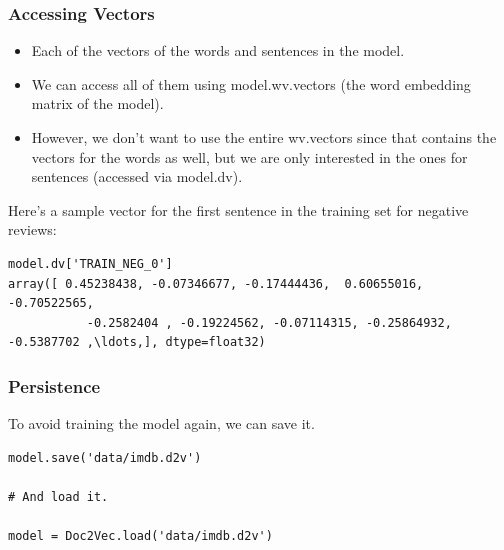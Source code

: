 \begin{frame}[fragile]\frametitle{Accessing Vectors}
\begin{itemize}
\item Each of the vectors of the words and sentences in the model. 
\item We can access all of them using model.wv.vectors (the word embedding matrix of the model).
\item However, we don't want to use the entire wv.vectors since that contains the vectors for the words as well, but we are only interested in the ones for sentences (accessed via model.dv).
\end{itemize}

Here's a sample vector for the first sentence in the training set for negative reviews:
\begin{lstlisting}
model.dv['TRAIN_NEG_0']
array([ 0.45238438, -0.07346677, -0.17444436,  0.60655016, -0.70522565,
           -0.2582404 , -0.19224562, -0.07114315, -0.25864932, -0.5387702 ,\ldots,], dtype=float32)
\end{lstlisting}
\end{frame}

\begin{frame}[fragile]\frametitle{Persistence}
To avoid training the model again, we can save it.
\begin{lstlisting}
model.save('data/imdb.d2v')

# And load it.

model = Doc2Vec.load('data/imdb.d2v')
\end{lstlisting}
\end{frame}


